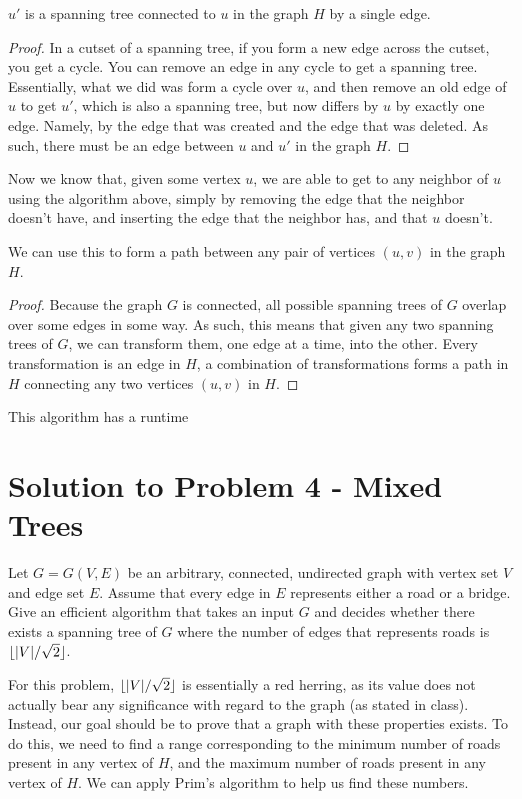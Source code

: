\documentclass[11pt]{article}
\DeclarePairedDelimiter\floor{\lfloor}{\rfloor}
\begin{document}
\begin{claim*} $u'$ is a spanning tree connected to $u$ in the graph $H$ by a single edge.\end{claim*}
\begin{proof} In a cutset of a spanning tree, if you form a new edge across the cutset, you get a cycle. You can remove an edge in any cycle to get a spanning tree. Essentially, what we did was form a cycle over $u$, and then remove an old edge of $u$ to get $u'$, which is also a spanning tree, but now differs by $u$ by exactly one edge. Namely, by the edge that was created and the edge that was deleted. As such, there must be an edge between $u$ and $u'$ in the graph $H$.\end{proof}

Now we know that, given some vertex $u$, we are able to get to any neighbor of $u$ using the algorithm above, simply by removing the edge that the neighbor doesn't have, and inserting the edge that the neighbor has, and that $u$ doesn't.

\begin{claim*} We can use this to form a path between any pair of vertices $(u,v)$ in the graph $H$.\end{claim*}
\begin{proof}Because the graph $G$ is connected, all possible spanning trees of $G$ overlap over some edges in some way. As such, this means that given any two spanning trees of $G$, we can transform them, one edge at a time, into the other. Every transformation is an edge in $H$, a combination of transformations forms a path in $H$ connecting any two vertices $(u,v)$ in $H$. \end{proof}

This algorithm has a runtime


\newpage

\section*{Solution to Problem 4 - Mixed Trees}
 Let $G = G(V, E)$ be an arbitrary, connected, undirected graph with vertex set $V$ and edge set $E$. Assume that every edge in $E$ represents either a road or a bridge. Give an efficient algorithm that takes an input $G$ and decides whether there exists a spanning tree of $G$ where the number of edges that represents roads is $\floor{|V|/\sqrt{2}}$.
 
 For this problem, $\floor{|V|/\sqrt{2}}$ is essentially a red herring, as its value does not actually bear any significance with regard to the graph (as stated in class). Instead, our goal should be to prove that a graph with these properties exists. To do this, we need to find a range corresponding to the minimum number of roads present in any vertex of $H$, and the maximum number of roads present in any vertex of $H$. We can apply Prim's algorithm to help us find these numbers.
 
\end{document}
